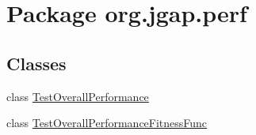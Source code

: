 \hypertarget{namespaceorg_1_1jgap_1_1perf}{\section{Package org.\-jgap.\-perf}
\label{namespaceorg_1_1jgap_1_1perf}
}
\subsection*{Classes}
\begin{DoxyCompactItemize}
\item 
class \hyperlink{classorg_1_1jgap_1_1perf_1_1_test_overall_performance}{Test\-Overall\-Performance}
\item 
class \hyperlink{classorg_1_1jgap_1_1perf_1_1_test_overall_performance_fitness_func}{Test\-Overall\-Performance\-Fitness\-Func}
\end{DoxyCompactItemize}
